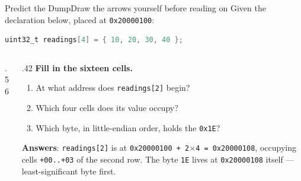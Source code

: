 \documentclass[9pt,aspectratio=169,xcolor=table]{beamer}
\begin{document}
{\beamerextras
\begin{frame}[fragile]{Predict the Dump}{Draw the arrows yourself before reading on}
    \leavevmode
    Given the declaration below, placed at \texttt{0x20000100}:

    \vspace{2mm}
    \begin{center}
    \begin{minipage}{.6\textwidth}
\begin{lstlisting}[language=C, basicstyle=\ttfamily\footnotesize]
uint32_t readings[4] = { 10, 20, 30, 40 };
\end{lstlisting}
    \end{minipage}
    \end{center}

    \vspace{1mm}
    \begin{columns}[c]
    \begin{column}{.56\textwidth}
        \begin{center}
        \end{center}
    \end{column}
    \begin{column}{.42\textwidth}
        \textbf{Fill in the sixteen cells.}
        {\small
        \begin{enumerate}\itemsep1pt
            \item At what address does \texttt{readings[2]} begin?
            \item Which four cells does its value occupy?
            \item Which byte, in little-endian order, holds the \texttt{0x1E}?
        \end{enumerate}}
        \vspace{2mm}
        {\small \textbf{Answers}: \texttt{readings[2]} is at \texttt{0x20000100 + 2$\times$4 = 0x20000108}, occupying cells \texttt{+00..+03} of the second row. The byte \texttt{1E} lives at \texttt{0x20000108} itself --- least-significant byte first.}
    \end{column}
    \end{columns}
\end{frame}
}
\end{document}
